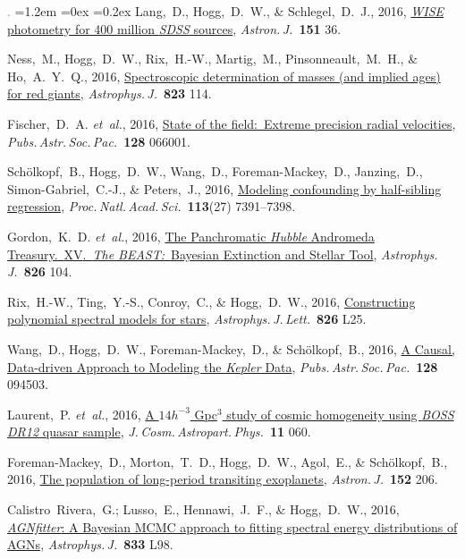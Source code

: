 \documentclass[10pt,letterpaper]{article}
\newcommand{\acronym}[1]{{\small{#1}}}
\newcommand{\foreign}[1]{\textsl{#1}}
\newcommand{\etal}{\foreign{et~al.}}
\newcommand{\project}[1]{\textsl{#1}}
\newcommand{\doi}[2]{\href{http://dx.doi.org/#1}{{#2}}}
\newcommand{\deemph}[1]{\textcolor{grey}{\footnotesize{#1}}}
\newcommand{\pubnumber}[1]{\deemph{{#1}.}}
\newcounter{refpubnum}
\newcommand{\hogglist}{%
    \rightmargin=0in
    \leftmargin=1.2em
    \topsep=0ex
    \partopsep=0pt
    \itemsep=0.2ex
    \parsep=0pt
    \itemindent=-1.0\leftmargin
    \listparindent=0.0\leftmargin
    \settowidth{\labelsep}{~}
    \usecounter{refpubnum}
  }
\begin{document}
\begin{list}{\pubnumber{\therefpubnum}}{\hogglist}
Lang,~D., Hogg,~D.~W., \& Schlegel,~D.~J., 2016,
\doi{10.3847/0004-6256/151/2/36}{\project{WISE} photometry for 400 million \project{SDSS} sources},
\textit{Astron.\,J.}\ \textbf{151} 36.
\item
Ness,~M., Hogg,~D.~W., Rix,~H.-W., Martig,~M., Pinsonneault,~M.~H., \& Ho,~A.~Y.~Q., 2016,
\doi{10.3847/0004-637X/823/2/114}{Spectroscopic determination of masses (and implied ages) for red giants},
\textit{Astrophys.\,J.}\ \textbf{823} 114.
\item
Fischer,~D.~A. \etal, 2016,
\doi{10.1088/1538-3873/128/964/066001}{State of the field:\ Extreme precision radial velocities},
\textit{Pubs.\,Astr.\,Soc.\,Pac.}\ \textbf{128} 066001.
\item
Sch\"olkopf,~B., Hogg,~D.~W., Wang,~D., Foreman-Mackey,~D., Janzing,~D., Simon-Gabriel,~C.-J., \& Peters,~J., 2016,
\doi{10.1073/pnas.1511656113}{Modeling confounding by half-sibling regression},
\textit{Proc.\,Natl.\,Acad.\,Sci.}\ \textbf{113}(27) 7391--7398.
\item
Gordon,~K.~D. \etal, 2016,
\doi{10.3847/0004-637X/826/2/104}{The Panchromatic \project{Hubble} Andromeda Treasury.\ \acronym{XV}.\
\project{The BEAST:}\ Bayesian Extinction and Stellar Tool},
\textit{Astrophys.\,J.}\ \textbf{826} 104.
\item
Rix,~H.-W., Ting,~Y.-S., Conroy,~C., \& Hogg,~D.~W., 2016,
\doi{10.3847/2041-8205/826/2/L25}{Constructing polynomial spectral models for stars},
\textit{Astrophys.\,J.\,Lett.}\ \textbf{826} L25.
\item
Wang,~D., Hogg,~D.~W., Foreman-Mackey,~D., \& Sch\"olkopf,~B., 2016,
\doi{10.1088/1538-3873/128/967/094503}{A Causal, Data-driven Approach to Modeling the \project{Kepler} Data},
\textit{Pubs.\,Astr.\,Soc.\,Pac.}\ \textbf{128} 094503.
\item
Laurent,~P. \etal, 2016,
\doi{10.1088/1475-7516/2016/11/060}{A $14 h^{-3}$ Gpc$^3$ study of cosmic homogeneity using \project{BOSS DR12} quasar sample},
\textit{J.\,Cosm.\,Astropart.\,Phys.}\ \textbf{11} 060.
\item
Foreman-Mackey,~D., Morton,~T.~D., Hogg,~D.~W., Agol,~E., \& Sch\"olkopf,~B., 2016,
\doi{10.3847/0004-6256/152/6/206}{The population of long-period transiting exoplanets},
\textit{Astron.\,J.}\ \textbf{152} 206.
\item
Calistro~Rivera,~G.; Lusso,~E., Hennawi,~J.~F., \& Hogg,~D.~W., 2016,
\doi{10.3847/1538-4357/833/1/98}{\project{AGNfitter}: A Bayesian MCMC approach to fitting spectral energy distributions of AGNs},
\textit{Astrophys.\,J.}\ \textbf{833} L98.

\end{list}
\end{document}
